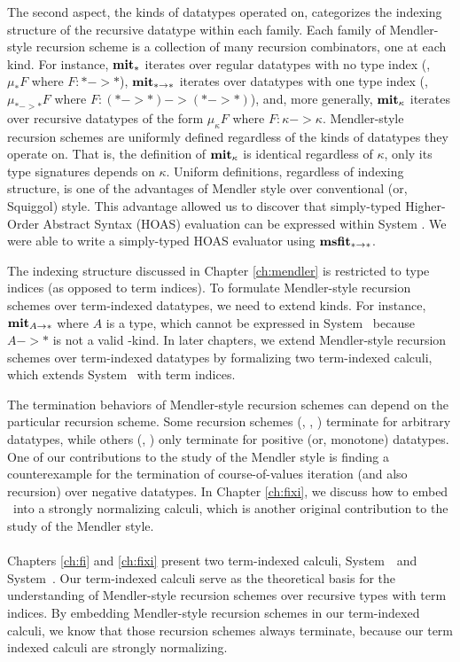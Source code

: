 The second aspect, the kinds of datatypes operated on, categorizes
the indexing structure of the recursive datatype within each family.
Each family of Mendler-style recursion scheme is a collection of
many recursion combinators, one at each kind. For instance, $\mathbf{mit}_{*}$
iterates over regular datatypes with no type index (\ie, $\mu_{*}F$
where $F : * -> *$), $\mathbf{mit}_{* -> *}$ iterates over datatypes with
one type index (\ie, $\mu_{* -> *} F$ where $F : (* -> *) -> (* -> *)$),
and, more generally, $\mathbf{mit}_{\kappa}$ iterates over recursive datatypes of
the form $\mu_{\kappa}F$ where $F : \kappa -> \kappa$.
Mendler-style recursion schemes are uniformly defined regardless of the kinds
of datatypes they operate on. That is, the definition of $\mathbf{mit}_{\kappa}$ is
identical regardless of $\kappa$, only its type signatures depends on $\kappa$.
Uniform definitions, regardless of indexing structure, is one of the advantages
of Mendler style over conventional (or, Squiggol) style. This advantage allowed
us to discover that simply-typed Higher-Order Abstract Syntax (HOAS) evaluation
can be expressed within System \Fw. We were able to write a simply-typed HOAS
evaluator using $\mathbf{msfit}_{* -> *}$.

The indexing structure discussed in Chapter \ref{ch:mendler} is restricted to
type indices (as opposed to term indices). To formulate Mendler-style recursion
schemes over term-indexed datatypes, we need to extend kinds. For instance,
$\mathbf{mit}_{A -> *}$ where $A$ is a type, which cannot be expressed in System \Fw\ 
because $A -> *$ is not a valid \Fw-kind. In later chapters, we extend
Mendler-style recursion schemes over term-indexed datatypes by formalizing
two term-indexed calculi, which extends System \Fw\ with term indices.

The termination behaviors of Mendler-style recursion schemes can depend on
the particular recursion scheme. Some recursion schemes (\MIt, \MPr, \MsfIt)
terminate for arbitrary datatypes, while others (\McvPr, \McvIt) only terminate
for positive (or, monotone) datatypes. One of our contributions to the study of
the Mendler style is finding a counterexample for the termination of
course-of-values iteration (and also recursion) over negative datatypes.
In Chapter \ref{ch:fixi}, we discuss how to embed \McvPr\ into
a strongly normalizing calculi, which is another original contribution to
the study of the Mendler style.

\paragraph{}
Chapters \ref{ch:fi} and \ref{ch:fixi} present two term-indexed calculi,
System~\Fi\ and System~\Fixi. Our term-indexed calculi serve as
the theoretical basis for the understanding of Mendler-style recursion schemes
over recursive types with term indices. By embedding Mendler-style recursion
schemes in our term-indexed calculi, we know that those recursion schemes
always terminate, because our term indexed calculi are strongly normalizing.

